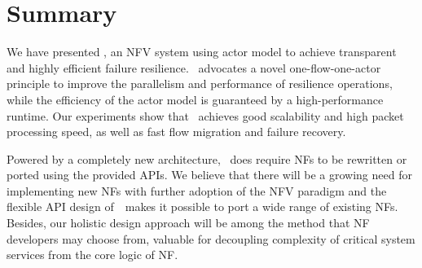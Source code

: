 \section{Summary}
\label{sec:nfvactor-conclusion}

We have presented \nfactor, an NFV system using actor model to achieve transparent and highly efficient failure resilience. \nfactor~advocates a novel one-flow-one-actor principle to improve the parallelism and performance of resilience operations, while the efficiency of the actor model is guaranteed by a high-performance runtime. Our experiments show that \nfactor~achieves good scalability and high packet processing speed, as well as fast flow migration and failure recovery.

Powered by a completely new architecture, \nfactor~does require NFs to be rewritten or ported using the provided APIs. We believe that there will be a growing need for implementing new NFs with further adoption of the NFV paradigm and the flexible API design of~\nfactor~makes it possible to port a wide range of existing NFs. Besides, our holistic design approach will be among the method that NF developers may choose from, valuable for decoupling complexity of critical system services from the core logic of NF. %


